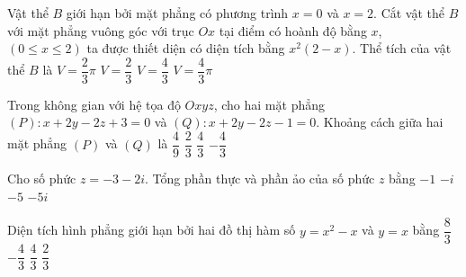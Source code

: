 \begin{ex}%
Vật thể $B$ giới hạn bởi mặt phẳng có phương trình $x=0$ và $x=2$. Cắt vật thể $B$ với mặt phẳng vuông góc với trục $Ox$ tại điểm có hoành độ bằng $x$, $(0\leq x\leq 2)$ ta được thiết diện có diện tích bằng $x^2(2-x)$. Thể tích của vật thể $B$ là
\choice 
{$V=\dfrac{2}{3}\pi$}
{$V=\dfrac{2}{3}$}
{\True $V=\dfrac{4}{3}$}
{$V=\dfrac{4}{3}\pi$}
\end{ex}
\begin{ex}%
Trong không gian với hệ tọa độ $Oxyz$, cho hai mặt phẳng $(P)\colon x+2y-2z+3=0$ và $(Q)\colon x+2y-2z-1=0$. Khoảng cách giữa hai mặt phẳng $(P)$ và $(Q)$ là 
\choice 
{$\dfrac{4}{9}$}
{$\dfrac{2}{3}$}
{\True $\dfrac{4}{3}$}
{$-\dfrac{4}{3}$}

\end{ex}
\begin{ex}%
Cho số phức $z=-3-2i$. Tổng phần thực và phần ảo của số phức $z$ bằng
\choice 
{$-1$}
{$-i$}
{\True $-5$}
{$-5i$}
\end{ex}
\begin{ex}%
Diện tích hình phẳng giới hạn bởi hai đồ thị hàm số $y=x^2-x$ và $y=x$ bằng
\choice 
{$\dfrac{8}{3}$}
{$-\dfrac{4}{3}$}
{\True $\dfrac{4}{3}$}
{$\dfrac{2}{3}$}
\end{ex}
